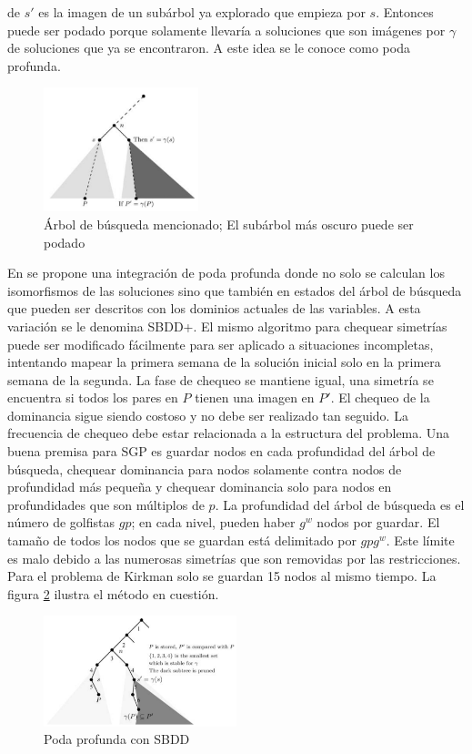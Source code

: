 \documentclass[letter, 10pt]{article}
\begin{document}
de $s'$ es la imagen de un subárbol ya explorado que empieza por $s$. Entonces puede ser podado porque solamente llevaría a soluciones que son imágenes por $\gamma$ de soluciones que ya se encontraron. A este idea se le conoce como poda profunda.

\begin{figure}[h]
    \centering
    \includegraphics[width=0.4\textwidth]{figures/prunedMcKay.png}
    \caption{Árbol de búsqueda mencionado; El subárbol más oscuro puede ser podado}
    \label{fig:mckaypruned}
\end{figure}

En \cite{barnier2005solving} se propone una integración de poda profunda donde no solo se calculan los isomorfismos de las soluciones sino que también en estados del árbol de búsqueda que pueden ser descritos con los dominios actuales de las variables. A esta variación se le denomina SBDD+. El mismo algoritmo para chequear simetrías puede ser modificado fácilmente para ser aplicado a situaciones incompletas, intentando mapear la primera semana de la solución inicial solo en la primera semana de la segunda. La fase de chequeo se mantiene igual, una simetría se encuentra si todos los pares en $P$ tienen una imagen en $P'$. El chequeo de la dominancia sigue siendo costoso y no debe ser realizado tan seguido. La frecuencia de chequeo debe estar relacionada a la estructura del problema. Una buena premisa para SGP es guardar nodos en cada profundidad del árbol de búsqueda, chequear dominancia para nodos solamente contra nodos de profundidad más pequeña y chequear dominancia solo para nodos en profundidades que son múltiplos de $p$. La profundidad del árbol de búsqueda es el número de golfistas $gp$; en cada nivel, pueden haber $g^w$ nodos por guardar. El tamaño de todos los nodos que se guardan está delimitado por $gpg^w$. Este límite es malo debido a las numerosas simetrías que son removidas por las restricciones. Para el problema de Kirkman solo se guardan 15 nodos al mismo tiempo. La figura \ref{fig:sbdd+} ilustra el método en cuestión.

\begin{figure}
    \centering
    \includegraphics[width=0.5\textwidth]{figures/sbdd+.png}
    \caption{Poda profunda con SBDD}
    \label{fig:sbdd+}
\end{figure}
\end{document}

